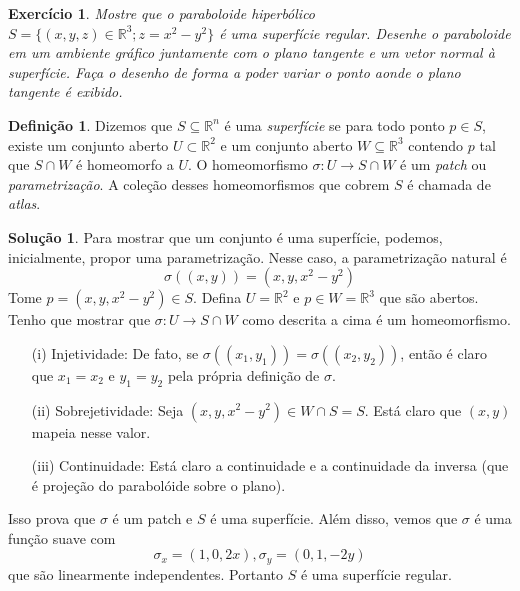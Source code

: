 \documentclass[a4paper,12pt]{article}
\newcommand{\R}{\mathbb{R}}
\theoremstyle{exer}
\newtheorem{exercise}{Exercício}
\theoremstyle{definition}
\newtheorem{solution}{Solução}
\newtheorem{definition}{Definição}
\theoremstyle{plain}
\begin{document}
\begin{exercise}
    Mostre que o paraboloide hiperbólico $S = \{(x, y, z) \in \R^3; z = x^2 -
    y^2\}$ é uma superfície regular. Desenhe o paraboloide em um ambiente
    gráfico juntamente com o plano tangente e um vetor normal à superfície.
    Faça o desenho de forma a poder variar o ponto aonde o plano tangente é exibido.
\end{exercise}

\begin{definition}
    Dizemos que $S \subseteq \mathbb{R}^n$ é uma {\em superfície} se para todo
    ponto $p \in S$, existe um conjunto aberto $U \subset \mathbb{R}^2$ e um
    conjunto aberto $W \subseteq \mathbb{R}^3$ contendo $p$ tal que $S \cap W$
    é homeomorfo a $U$.  O homeomorfismo $\sigma : U \to S \cap W$ é um
    {\em patch} ou {\em parametrização}. A coleção desses homeomorfismos que cobrem
    $S$ é chamada de {\em atlas}. 
\end{definition}

\begin{solution}
    Para mostrar que um conjunto é uma superfície, podemos, inicialmente,
    propor uma parametrização. Nesse caso, a parametrização natural é 
    $$
    \sigma((x,y)) = (x,y,x^2 - y^2)
    $$
    Tome $p = (x,y,x^2 - y^2)\in S$. Defina $U = \R^2$ e $p \in W = \R^3 $ que são
    abertos. Tenho que mostrar que $\sigma : U \to S \cap W$ como descrita a
    cima é um homeomorfismo. 

    \begin{enumerate}
        \item[(i)] Injetividade: De fato, se $\sigma((x_1, y_1)) =
        \sigma((x_2, y_2))$, então é claro que $x_1 = x_2$ e $y_1 = y_2$ pela
        própria definição de $\sigma$. 
        \item[(ii)] Sobrejetividade: Seja $(x,y,x^2 - y^2) \in W \cap S = S$.
        Está claro que $(x,y)$ mapeia nesse valor. 
        \item[(iii)] Continuidade: Está claro a continuidade e a continuidade
        da inversa (que é projeção do parabolóide sobre o plano).
    \end{enumerate}

    Isso prova que $\sigma$ é um patch e $S$ é uma superfície. Além disso,
    vemos que $\sigma$ é uma função suave com 
    $$
    \sigma_x = (1, 0, 2x), \sigma_y = (0,1,-2y)
    $$
    que são linearmente independentes. Portanto $S$ é uma superfície regular. 
\end{solution}
\end{document}
